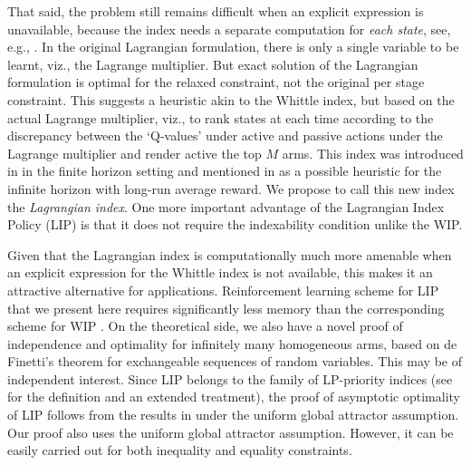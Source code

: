 \documentclass[12pt]{article}
\numberwithin{equation}{section}
\newcommand{\1}{\textbf{1}}
\begin{document}
That said, the problem still remains difficult when an explicit expression is unavailable, because the index needs a separate computation for \textit{each state}, see, e.g., \cite{Avrachenkov2}. In the original Lagrangian formulation, there is only a single variable to be learnt, viz., the Lagrange multiplier. But exact solution of the Lagrangian formulation is optimal for the relaxed constraint, not the original per stage constraint. This suggests a heuristic akin to the Whittle index, but based on the actual Lagrange multiplier, viz., to rank states at each time according to the discrepancy between the `Q-values' under active and passive actions under the Lagrange multiplier and render active the top $M$ arms. This index was introduced in \cite{Brown} in the finite horizon setting and mentioned in \cite{Gast} as a
possible heuristic for the infinite horizon with long-run average reward. We propose to call this new index the {\it Lagrangian index}. 
One more important advantage of the Lagrangian Index Policy (LIP) is that it does not require the indexability condition unlike the WIP. 

Given that the Lagrangian index is computationally much more amenable when an explicit expression for the Whittle index is not available, this makes it an attractive alternative for applications. Reinforcement learning scheme for LIP that we present here requires significantly less memory than the corresponding scheme
for WIP \cite{Avrachenkov2,Nakhleh,Pagare,Robledo1,Robledo2}.
On the theoretical side, we also have a novel proof  of independence and optimality for infinitely many homogeneous arms, based on de Finetti's theorem for exchangeable sequences of random variables. This may be of independent interest. Since LIP belongs to the family of LP-priority indices (see \cite{Verloop} for the definition and an extended treatment),
the proof of asymptotic optimality of LIP follows from the results in \cite{Verloop} under the uniform global attractor assumption. 
Our proof also uses the uniform global attractor assumption. However, it can be easily carried out for both inequality and equality constraints. 
\end{document}
